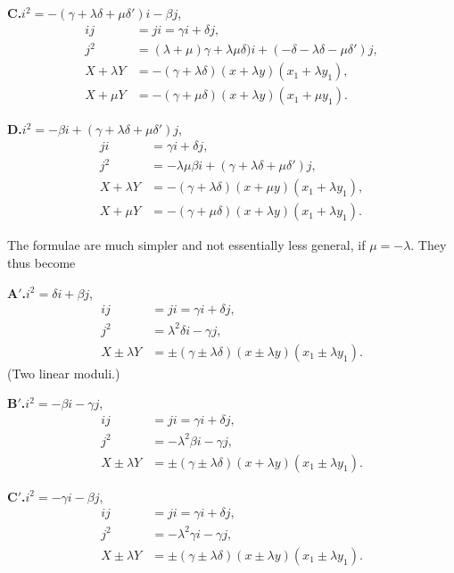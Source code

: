 \documentclass[11pt,a4paper]{book}
\begin{document}
\medskip
\textbf{C.}\quad $i^2 = -(\gamma + \lambda\delta + \mu\delta') i - \beta j$,
\begin{align*}
ij &= ji = \gamma i + \delta j,\\
j^2 &= (\lambda + \mu)\gamma + \lambda\mu\delta) i + (-\delta - \lambda\delta - \mu\delta')j,\\
X + \lambda Y &= -(\gamma + \lambda\delta)(x + \lambda y)(x_1 + \lambda y_1),\\
X + \mu Y &= -(\gamma + \mu\delta)(x + \lambda y)(x_1 + \mu y_1).
\end{align*}

\medskip
\textbf{D.}\quad $i^2 = -\beta i + (\gamma + \lambda\delta + \mu\delta')j$,
\begin{align*}
ji &= \gamma i + \delta j,\\
j^2 &= -\lambda\mu\beta i + (\gamma + \lambda\delta + \mu\delta')j,\\
X + \lambda Y &= -(\gamma + \lambda\delta)(x + \mu y)(x_1 + \lambda y_1),\\
X + \mu Y &= -(\gamma + \mu\delta)(x + \lambda y)(x_1 + \lambda y_1).
\end{align*}

\newpage
\setcounter{page}{130}

The formulae are much simpler and not essentially less general, if $\mu = -\lambda$. They
thus become

\medskip
\textbf{A$'$.}\quad $i^2 = \delta i + \beta j$,
\begin{align*}
ij &= ji = \gamma i + \delta j,\\
j^2 &= \lambda^2\delta i - \gamma j,\\
X \pm \lambda Y &= \pm (\gamma \pm \lambda\delta)(x \pm \lambda y)(x_1 \pm \lambda y_1).
\end{align*}
(Two linear moduli.)

\medskip
\textbf{B$'$.}\quad $i^2 = -\beta i - \gamma j$,
\begin{align*}
ij &= ji = \gamma i + \delta j,\\
j^2 &= -\lambda^2\beta i - \gamma j,\\
X \pm \lambda Y &= \pm (\gamma \pm \lambda\delta)(x + \lambda y)(x_1 \pm \lambda y_1).
\end{align*}

\medskip
\textbf{C$'$.}\quad $i^2 = -\gamma i - \beta j$,
\begin{align*}
ij &= ji = \gamma i + \delta j,\\
j^2 &= -\lambda^2\gamma i - \gamma j,\\
X \pm \lambda Y &= \pm (\gamma \pm \lambda\delta)(x \pm \lambda y)(x_1 \pm \lambda y_1).
\end{align*}
\end{document}
